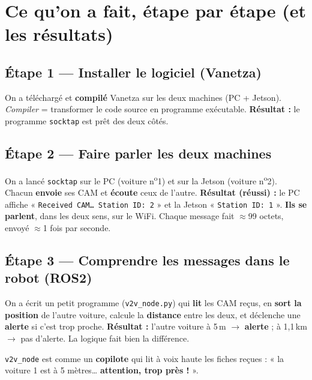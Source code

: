 \documentclass[a4paper,11pt]{article}
\begin{document}
\section{Ce qu'on a fait, étape par étape (et les résultats)}

\subsection{Étape 1 --- Installer le logiciel (Vanetza)}
On a téléchargé et \textbf{compilé} Vanetza sur les deux machines (PC + Jetson).
\emph{Compiler} = transformer le code source en programme exécutable.
\textbf{Résultat :} le programme \texttt{socktap} est prêt des deux côtés.

\subsection{Étape 2 --- Faire parler les deux machines}
On a lancé \texttt{socktap} sur le PC (voiture n\textsuperscript{o}1) et sur la
Jetson (voiture n\textsuperscript{o}2). Chacun \textbf{envoie} ses CAM et
\textbf{écoute} ceux de l'autre.
\textbf{Résultat (réussi) :} le PC affiche « \texttt{Received CAM\ldots{} Station
ID: 2} » et la Jetson « \texttt{Station ID: 1} ». \textbf{Ils se parlent}, dans les
deux sens, sur le WiFi. Chaque message fait $\approx$99 octets, envoyé $\approx$1
fois par seconde.

\subsection{Étape 3 --- Comprendre les messages dans le robot (ROS2)}
On a écrit un petit programme (\texttt{v2v\_node.py}) qui \textbf{lit} les CAM
reçus, en \textbf{sort la position} de l'autre voiture, calcule la \textbf{distance}
entre les deux, et déclenche une \textbf{alerte} si c'est trop proche.
\textbf{Résultat :} l'autre voiture à 5\,m $\rightarrow$ \textbf{alerte} ; à
1,1\,km $\rightarrow$ pas d'alerte. La logique fait bien la différence.

\begin{analogie}
\texttt{v2v\_node} est comme un \textbf{copilote} qui lit à voix haute les fiches
reçues : « la voiture 1 est à 5 mètres\ldots{} \textbf{attention, trop près !} ».
\end{analogie}
\end{document}
